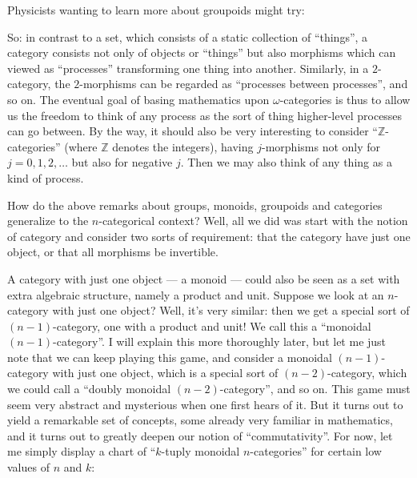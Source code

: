 \documentclass{article}
\def\tightlist{}
\renewcommand{\texttt}[1]{%
  \begingroup
  \ttfamily
  \begingroup\lccode`~=`/\lowercase{\endgroup\def~}{/\discretionary{}{}{}}%
  \begingroup\lccode`~=`[\lowercase{\endgroup\def~}{[\discretionary{}{}{}}%
  \begingroup\lccode`~=`.\lowercase{\endgroup\def~}{.\discretionary{}{}{}}%
  \catcode`/=\active\catcode`[=\active\catcode`.=\active
  \scantokens{#1\noexpand}%
  \endgroup
}
\begin{document}
Physicists wanting to learn more about groupoids might try:


So: in contrast to a set, which consists of a static collection of
``things'', a category consists not only of objects or ``things'' but
also morphisms which can viewed as ``processes'' transforming one thing
into another. Similarly, in a \(2\)-category, the \(2\)-morphisms can be
regarded as ``processes between processes'', and so on. The eventual
goal of basing mathematics upon \(\omega\)-categories is thus to allow
us the freedom to think of any process as the sort of thing higher-level
processes can go between. By the way, it should also be very interesting
to consider ``\(\mathbb{Z}\)-categories'' (where \(\mathbb{Z}\) denotes
the integers), having \(j\)-morphisms not only for \(j = 0,1,2,\ldots\)
but also for negative \(j\). Then we may also think of any thing as a
kind of process.

How do the above remarks about groups, monoids, groupoids and categories
generalize to the \(n\)-categorical context? Well, all we did was start
with the notion of category and consider two sorts of requirement: that
the category have just one object, or that all morphisms be invertible.

A category with just one object --- a monoid --- could also be seen as a
set with extra algebraic structure, namely a product and unit. Suppose
we look at an \(n\)-category with just one object? Well, it's very
similar: then we get a special sort of \((n-1)\)-category, one with a
product and unit! We call this a ``monoidal \((n-1)\)-category''. I will
explain this more thoroughly later, but let me just note that we can
keep playing this game, and consider a monoidal \((n-1)\)-category with
just one object, which is a special sort of \((n-2)\)-category, which we
could call a ``doubly monoidal \((n-2)\)-category'', and so on. This
game must seem very abstract and mysterious when one first hears of it.
But it turns out to yield a remarkable set of concepts, some already
very familiar in mathematics, and it turns out to greatly deepen our
notion of ``commutativity''. For now, let me simply display a chart of
``\(k\)-tuply monoidal \(n\)-categories'' for certain low values of
\(n\) and \(k\):
\end{document}
